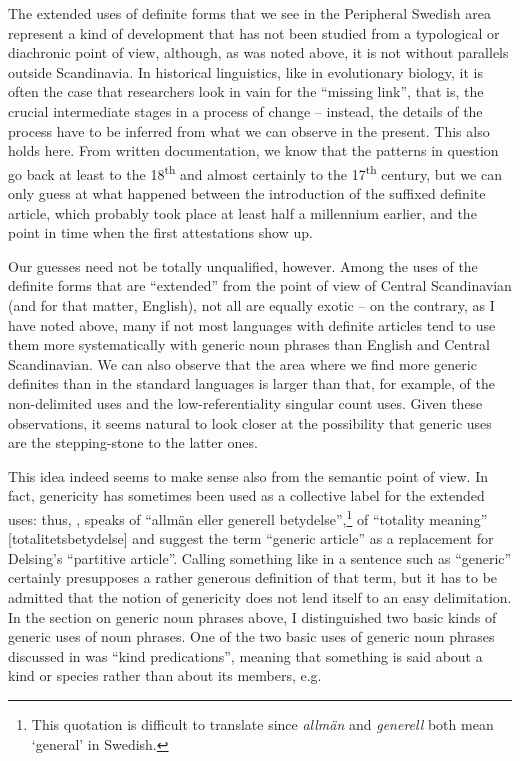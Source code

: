 The extended uses of definite forms that we see in the Peripheral Swedish area represent a kind of development that has not been studied from a typological or diachronic point of view, although, as was noted above, it is not without parallels outside Scandinavia. In historical linguistics, like in evolutionary biology, it is often the case that researchers look in vain for the “missing link”, that is, the crucial intermediate stages in a process of change – instead, the details of the process have to be inferred from what we can observe in the present. This also holds here. From written documentation, we know that the patterns in question go back at least to the 18\textsuperscript{th} and almost certainly to the 17\textsuperscript{th} century, but we can only guess at what happened between the introduction of the suffixed definite article, which probably took place at least half a millennium earlier, and the point in time when the first attestations show up. 

Our guesses need not be totally unqualified, however. Among the uses of the definite forms that are “extended” from the point of view of Central Scandinavian (and for that matter, English), not all are equally exotic – on the contrary, as I have noted above, many if not most languages with definite articles tend to use them more systematically with generic noun phrases than English and Central Scandinavian. We can also observe that the area where we find more generic definites than in the standard languages is larger than that, for example, of the non-delimited uses and the low-referentiality singular count uses. Given these observations, it seems natural to look closer at the possibility that generic uses are the stepping-stone to the latter ones. 

This idea indeed seems to make sense also from the semantic point of view. In fact, genericity has sometimes been used as a collective label for the extended uses: thus, \citet[134]{Hummelstedt1934}, speaks of “allmän eller generell betydelse”,\footnote{ This quotation is difficult to translate since \textit{allmän} and \textit{generell} both mean ‘general’ in Swedish.} \citet[29]{Marklund1976} of “totality meaning” [totalitetsbetydelse] and \citet{BergholmEtAl1999} suggest the term “generic article” as a replacement for Delsing’s “partitive article”. Calling something like  in a sentence such as  “generic” certainly presupposes a rather generous definition of that term, but it has to be admitted that the notion of genericity does not lend itself to an easy delimitation. In the section on generic noun phrases above, I distinguished two basic kinds of generic uses of noun phrases. One of the two basic uses of generic noun phrases discussed in  was “kind predications”, meaning that something is said about a kind or species rather than about its members, e.g. 

